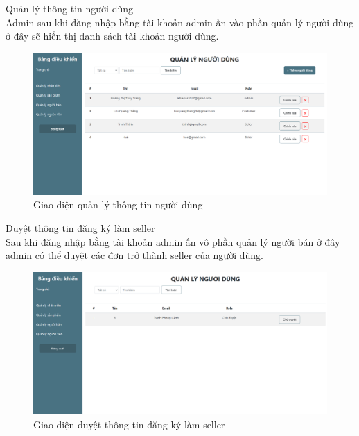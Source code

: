 \documentclass{article}
\begin{document}
{{{{{{{{{{{{{{{{{\begin{center}
\begin{figure}[htp]
		\end{figure}
	\end{center}
}
\newpage

{\large  
	\indent Quản lý thông tin người dùng\\
		{\large
	Admin sau khi đăng nhập bằng tài khoản admin ấn vào phần quản lý người dùng ở đây sẽ hiển thị danh sách tài khoản người dùng.}
	\begin{center}
		\begin{figure}[htp]
			\begin{center}
				\includegraphics[scale=.400]{anh41.png}
			\end{center}
			\caption{Giao diện quản lý thông tin người dùng}
			
		\end{figure}
	\end{center}
}
\newpage
{\large  
	\indent Duyệt thông tin đăng ký làm seller\\
		{\large
		Sau khi đăng nhập bằng tài khoản admin ấn vô phần quản lý người bán  ở đây admin có thể duyệt các đơn trở thành seller của người dùng.}
	\begin{center}
		\begin{figure}[htp]
			\begin{center}
				\includegraphics[scale=.400]{anh42.png}
			\end{center}
			\caption{Giao diện duyệt thông tin đăng ký làm seller}
			

\end{figure}
\end{center}}}}}}}}}}}}}}}}}}
\end{document}
